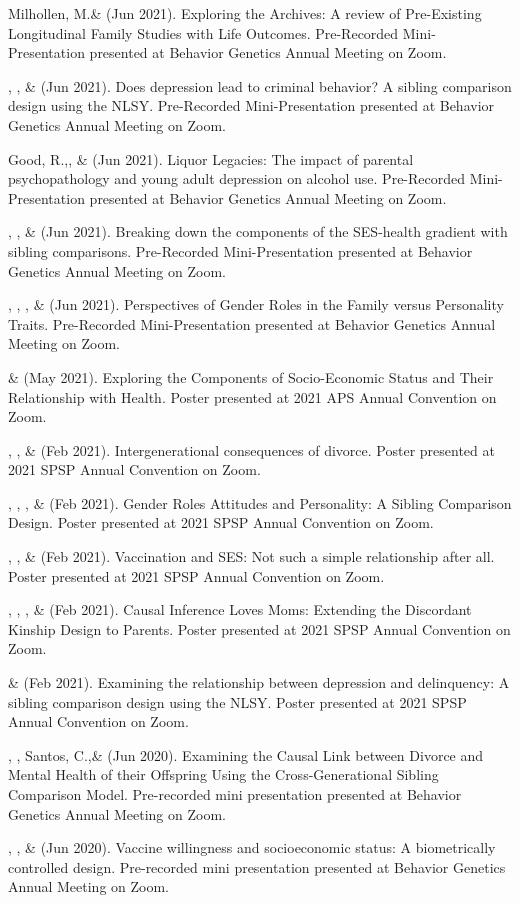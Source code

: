 \begin{etaremune}
%
\item Milhollen, M.\noteA \&  \meb (Jun 2021). Exploring the Archives: A review of Pre-Existing Longitudinal Family Studies with Life Outcomes. Pre-Recorded Mini-Presentation presented at Behavior Genetics Annual Meeting on Zoom.
%
\item \emsims, \jt, \&  \meb (Jun 2021). Does depression lead to criminal behavior? A sibling comparison design using the NLSY. Pre-Recorded Mini-Presentation presented at Behavior Genetics Annual Meeting on Zoom.
%
\item Good, R.,\noteA \yrh, \&  \meb (Jun 2021). Liquor Legacies: The impact of parental psychopathology and young adult depression on alcohol use. Pre-Recorded Mini-Presentation presented at Behavior Genetics Annual Meeting on Zoom.
%
\item \yrh, \jt, \& \meb (Jun 2021). Breaking down the components of the SES-health gradient with sibling comparisons. Pre-Recorded Mini-Presentation presented at Behavior Genetics Annual Meeting on Zoom.
%
\item \sherrym, \yrh, \jt, \& \meb (Jun 2021). Perspectives of Gender Roles in the Family versus Personality Traits.  Pre-Recorded Mini-Presentation presented at Behavior Genetics Annual Meeting on Zoom.
%
\item \yrh \& \meb (May 2021). Exploring the Components of Socio-Economic Status and Their Relationship with Health. Poster presented at 2021 APS Annual Convention on Zoom.
%
\item \kl, \jt, \& \meb (Feb 2021). Intergenerational consequences of divorce. Poster presented at 2021 SPSP Annual Convention on Zoom.
%
\item \sherrym, \yrh, \jt, \& \meb (Feb 2021). Gender Roles Attitudes and Personality: A Sibling Comparison Design. Poster presented at 2021 SPSP Annual Convention on Zoom.
%
\item \jt, \kl, \& \meb (Feb 2021). Vaccination and SES: Not such a simple relationship after all. Poster presented at 2021 SPSP Annual Convention on Zoom.
%
\item \meb, \emsims, \jt, \& \kl  (Feb 2021). Causal Inference Loves Moms: Extending the Discordant Kinship Design to Parents. Poster presented at 2021 SPSP Annual Convention on Zoom.
%
\item \emsims\hspace*{2 pt} \& \meb (Feb 2021). Examining the relationship between depression and delinquency: A sibling comparison design using the NLSY. Poster presented at 2021 SPSP Annual Convention on Zoom.
%
\item \kl, \jt, Santos, C.,\noteB \& \meb (Jun 2020). Examining the Causal Link between Divorce and Mental Health of their Offspring Using the Cross-Generational Sibling Comparison Model. Pre-recorded mini presentation presented at Behavior Genetics Annual Meeting on Zoom.
%
\item \jt, \kl, \& \meb (Jun 2020). Vaccine willingness and socioeconomic status: A biometrically controlled design. Pre-recorded mini presentation presented at Behavior Genetics Annual Meeting on Zoom.


\end{etaremune}
